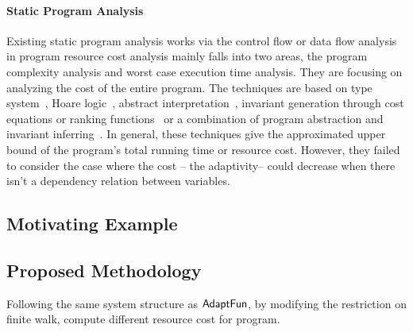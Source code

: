 \paragraph*{Static Program Analysis}
Existing static program analysis works via the control flow or data flow analysis 
in program resource cost analysis 
mainly falls into two areas, the program complexity analysis and worst case execution time analysis. 
They are focusing on analyzing the cost of the entire program. 
The techniques are based on
type system~\cite{CicekBG0H17, RajaniG0021}, Hoare logic~\cite{CarbonneauxHS15}, abstract interpretation~\cite{GustafssonEL05, HumenbergerJK18},
invariant generation through cost equations or ranking functions~\cite{BrockschmidtEFFG16,AlbertAGP08,AliasDFG10,Flores-MontoyaH14}
or a combination of program abstraction and invariant inferring~\cite{GulwaniZ10, SinnZV17,GulwaniJK09}.
In general, these techniques give the approximated upper bound of the program's total running time or resource cost.
However, they failed to consider the case where the cost -- the adaptivity-- could decrease when there isn't a dependency relation between variables.

\subsection{Motivating Example}
\label{subsubsec:furthers-cost-example}

\subsection{Proposed Methodology}
\label{subsubsec:furthers-cost-methodology}
Following the same system structure as $\textsf{AdaptFun}$,
by modifying the restriction on finite walk, compute different resource cost for program.

